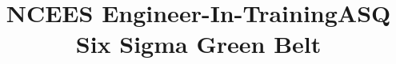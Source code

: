 \documentclass[12pt]{res} %
\begin{document}
\begin{resume}
      \employer{}
      \title{NCEES Engineer-In-Training}
      \dates{}
      \begin{position}
          \vspace{-42pt}
      \end{position}

      \employer{}
      \title{ASQ Six Sigma Green Belt}
      \dates{}
      \begin{position}
          \vspace{-28pt}
      \end{position}

    \end{resume}

\end{document}
